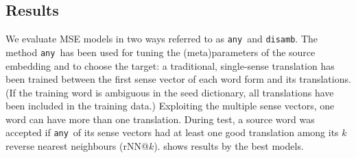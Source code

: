 \documentclass[11pt]{article}
\begin{document}
\subsection{Results}

\newcommand{\any}{\texttt{any}}
\newcommand{\disamb}{\texttt{disamb}}

We evaluate MSE models in two ways referred to as \any~and \disamb.  The method
\any~has been used for tuning the (meta)parameters of the source embedding and
to choose the target: a traditional, single-sense translation has been trained
between the first  sense vector of each word form and its
translations. (If the training word is ambiguous in the seed dictionary, all
translations have been included in the training data.)  Exploiting the multiple
sense vectors, one word can have more than one translation.  During test, a
source word was accepted if \any~of its sense vectors had at
least one good translation among its $k$ reverse nearest neighbours (rNN@$k$).
 shows results by the best models.
\end{document}
